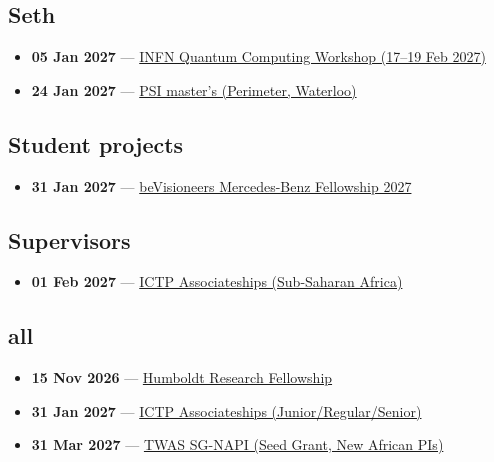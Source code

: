 \subsection*{Seth}
\begin{itemize}[leftmargin=1.4em,itemsep=0.1em]
  \item \textbf{05 Jan 2027} --- \href{https://agenda.infn.it/event/53380/abstracts/}{INFN Quantum Computing Workshop (17--19 Feb 2027)}
  \item \textbf{24 Jan 2027} --- \href{https://perimeterinstitute.ca/training/masters-program/psi-how-apply}{PSI master's (Perimeter, Waterloo)}
\end{itemize}

\subsection*{Student projects}
\begin{itemize}[leftmargin=1.4em,itemsep=0.1em]
  \item \textbf{31 Jan 2027} --- \href{https://opportunitypool.org/apply-for-the-bevisioneers-mercedes-benz-fellowship-2027fully-funded/}{beVisioneers Mercedes-Benz Fellowship 2027}
\end{itemize}

\subsection*{Supervisors}
\begin{itemize}[leftmargin=1.4em,itemsep=0.1em]
  \item \textbf{01 Feb 2027} --- \href{https://www.ictp.it/home/associates-programme}{ICTP Associateships (Sub-Saharan Africa)}
\end{itemize}

\subsection*{all}
\begin{itemize}[leftmargin=1.4em,itemsep=0.1em]
  \item \textbf{15 Nov 2026} --- \href{https://www.humboldt-foundation.de/en/apply/sponsorship-programmes/humboldt-research-fellowship}{Humboldt Research Fellowship}
  \item \textbf{31 Jan 2027} --- \href{https://www.ictp.it/home/associates-programme}{ICTP Associateships (Junior/Regular/Senior)}
  \item \textbf{31 Mar 2027} --- \href{https://twas.org/opportunity/seed-grant-new-african-principal-investigators-sg-napi}{TWAS SG-NAPI (Seed Grant, New African PIs)}
\end{itemize}

